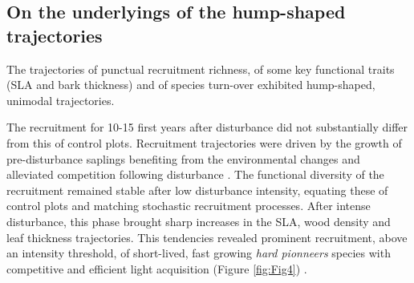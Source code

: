 \documentclass[fleqn,10pt]{ArtEcoFoG} %
\begin{document}
\subsection{On the underlyings of the hump-shaped
trajectories}\label{on-the-underlyings-of-the-hump-shaped-trajectories}

The trajectories of punctual recruitment richness, of some key
functional traits (SLA and bark thickness) and of species turn-over
exhibited hump-shaped, unimodal trajectories.

The recruitment for 10-15 first years after disturbance did not
substantially differ from this of control plots. Recruitment
trajectories were driven by the growth of pre-disturbance saplings
benefiting from the environmental changes and alleviated competition
following disturbance \citep{Herault2010}. The functional diversity of
the recruitment remained stable after low disturbance intensity,
equating these of control plots and matching stochastic recruitment
processes. After intense disturbance, this phase brought sharp increases
in the SLA, wood density and leaf thickness trajectories. This
tendencies revealed prominent recruitment, above an intensity threshold,
of short-lived, fast growing \emph{hard pionneers} species with
competitive and efficient light acquisition (Figure \ref{fig:Fig4})
\citep{Wright2004, Chave2009b, Herault2011, Reich2014}.
\end{document}
